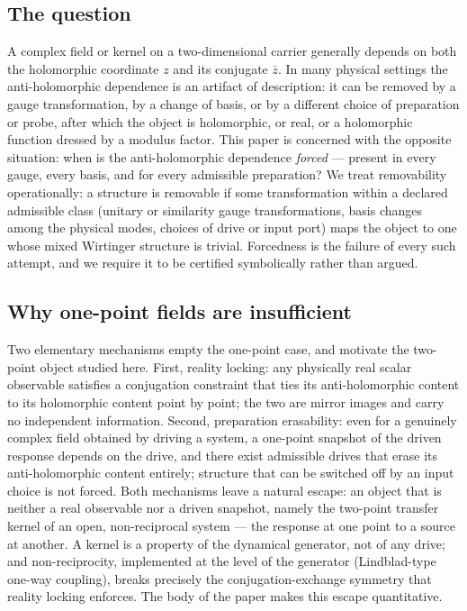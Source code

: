 \documentclass[11pt,a4paper]{article}
\newcommand{\zb}{\bar{z}}
\begin{document}
\subsection{The question}

A complex field or kernel on a two-dimensional carrier generally depends on both
the holomorphic coordinate $z$ and its conjugate $\zb$. In many physical settings
the anti-holomorphic dependence is an artifact of description: it can be removed
by a gauge transformation, by a change of basis, or by a different choice of
preparation or probe, after which the object is holomorphic, or real, or a
holomorphic function dressed by a modulus factor. This paper is concerned with
the opposite situation: when is the anti-holomorphic dependence \emph{forced} ---
present in every gauge, every basis, and for every admissible preparation? We treat
removability operationally: a structure is removable if some transformation
within a declared admissible class (unitary or similarity gauge
transformations, basis changes among the physical modes, choices of drive or
input port) maps the object to one whose mixed Wirtinger structure is trivial.
Forcedness is the failure of every such attempt, and we require it to be
certified symbolically rather than argued.

\subsection{Why one-point fields are insufficient}

Two elementary mechanisms empty the one-point case, and motivate the two-point
object studied here. First, reality locking: any physically real scalar
observable satisfies a conjugation constraint that ties its anti-holomorphic
content to its holomorphic content point by point; the two are mirror images
and carry no independent information. Second, preparation erasability: even for
a genuinely complex field obtained by driving a system, a one-point snapshot of
the driven response depends on the drive, and there exist admissible drives
that erase its anti-holomorphic content entirely; structure that can be
switched off by an input choice is not forced. Both mechanisms leave a natural
escape: an object that is neither a real observable nor a driven snapshot,
namely the two-point transfer kernel of an open, non-reciprocal system --- the
response at one point to a source at another. A kernel is a property of the
dynamical generator, not of any drive; and non-reciprocity, implemented at the
level of the generator (Lindblad-type one-way coupling), breaks precisely the
conjugation-exchange symmetry that reality locking enforces. The body of the
paper makes this escape quantitative.
\end{document}
